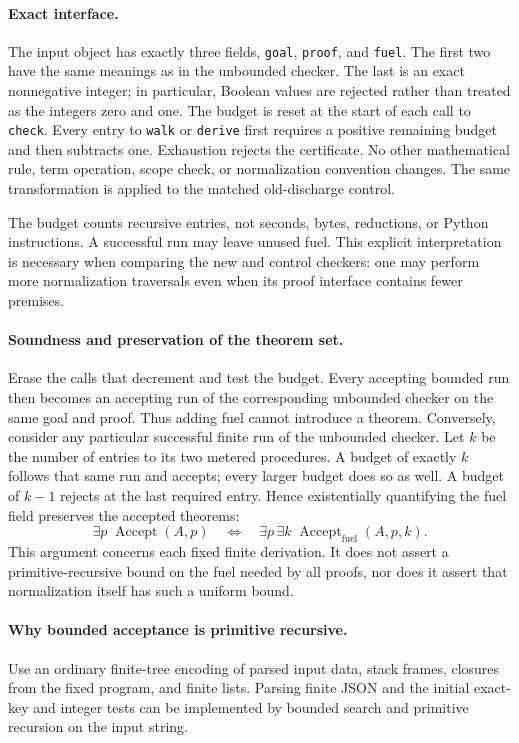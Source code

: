 \documentclass[11pt,a4paper]{article}
\theoremstyle{definition}\newtheorem{definition}[theorem]{Definition}
\theoremstyle{remark}\newtheorem{remark}[theorem]{Remark}
\begin{document}
\paragraph{Exact interface.}
The input object has exactly three fields, \texttt{goal}, \texttt{proof}, and
\texttt{fuel}. The first two have the same meanings as in the unbounded
checker. The last is an exact nonnegative integer; in particular, Boolean
values are rejected rather than treated as the integers zero and one. The
budget is reset at the start of each call to \texttt{check}. Every entry to
\texttt{walk} or \texttt{derive} first requires a positive remaining budget
and then subtracts one. Exhaustion rejects the certificate. No other
mathematical rule, term operation, scope check, or normalization convention
changes. The same transformation is applied to the matched old-discharge
control.

The budget counts recursive entries, not seconds, bytes, reductions, or
Python instructions. A successful run may leave unused fuel. This explicit
interpretation is necessary when comparing the new and control checkers:
one may perform more normalization traversals even when its proof interface
contains fewer premises.

\paragraph{Soundness and preservation of the theorem set.}
Erase the calls that decrement and test the budget. Every accepting bounded
run then becomes an accepting run of the corresponding unbounded checker
on the same goal and proof. Thus adding fuel cannot introduce a theorem.
Conversely, consider any particular successful finite run of the unbounded
checker. Let $k$ be the number of entries to its two metered procedures. A
budget of exactly $k$ follows that same run and accepts; every larger budget
does so as well. A budget of $k-1$ rejects at the last required entry. Hence
existentially quantifying the fuel field preserves the accepted theorems:
\[
  \exists p\;\operatorname{Accept}(A,p)
  \quad\Longleftrightarrow\quad
  \exists p\,\exists k\;\operatorname{Accept}_{\mathrm{fuel}}(A,p,k).
\]
This argument concerns each fixed finite derivation. It does not assert a
primitive-recursive bound on the fuel needed by all proofs, nor does it assert
that normalization itself has such a uniform bound.

\paragraph{Why bounded acceptance is primitive recursive.}
Use an ordinary finite-tree encoding of parsed input data, stack frames,
closures from the fixed program, and finite lists. Parsing finite JSON and
the initial exact-key and integer tests can be implemented by bounded
search and primitive recursion on the input string.
\end{document}
